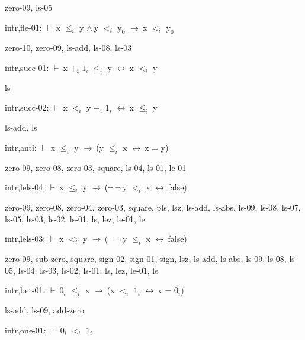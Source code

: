 \documentclass[a4paper]{article}
\newcommand{\Fol}{\mbox{$\vdash\ $}}
\newcommand{\Not}{\mbox{$\neg\ $}}
\newcommand{\And}{\mbox{$\wedge\ $}}
\newcommand{\Imp}{\mbox{$\rightarrow\ $}}
\newcommand{\Equiv}{\mbox{$\leftrightarrow\ $}}
\begin{document}
zero-09, ls-05

\bigskip

intr,fle-01: 
 \Fol x $\mbox{$\le$}_{i}$ y \And y $\mbox{$<$}_{i}$ $\mbox{y}_{0}$ \Imp x $\mbox{$<$}_{i}$ $\mbox{y}_{0}$



zero-10, zero-09, ls-add, ls-08, ls-03

\bigskip

intr,succ-01: 
 \Fol x $\mbox{+}_{i}$ $\mbox{1}_{i}$ $\mbox{$\le$}_{i}$ y \Equiv x $\mbox{$<$}_{i}$ y



ls

\bigskip

intr,succ-02: 
 \Fol x $\mbox{$<$}_{i}$ y $\mbox{+}_{i}$ $\mbox{1}_{i}$ \Equiv x $\mbox{$\le$}_{i}$ y



ls-add, ls

\bigskip

intr,anti: 
 \Fol x $\mbox{$\le$}_{i}$ y \Imp (y $\mbox{$\le$}_{i}$ x \Equiv x = y)



zero-09, zero-08, zero-03, square, ls-04, ls-01, le-01

\bigskip

intr,lels-04: 
 \Fol x $\mbox{$\le$}_{i}$ y \Imp (\Not \Not y $\mbox{$<$}_{i}$ x \Equiv false)



zero-09, zero-08, zero-04, zero-03, square, pls, lsz, ls-add, ls-abs, ls-09, ls-08, ls-07, ls-05, ls-03, ls-02, ls-01, ls, lez, le-01, le

\bigskip

intr,lels-03: 
 \Fol x $\mbox{$<$}_{i}$ y \Imp (\Not \Not y $\mbox{$\le$}_{i}$ x \Equiv false)



zero-09, sub-zero, square, sign-02, sign-01, sign, lsz, ls-add, ls-abs, ls-09, ls-08, ls-05, ls-04, ls-03, ls-02, ls-01, ls, lez, le-01, le

\bigskip

intr,bet-01: 
 \Fol $\mbox{0}_{i}$ $\mbox{$\le$}_{i}$ x \Imp (x $\mbox{$<$}_{i}$ $\mbox{1}_{i}$ \Equiv x = $\mbox{0}_{i}$)



ls-add, ls-09, add-zero

\bigskip

intr,one-01: 
 \Fol $\mbox{0}_{i}$ $\mbox{$<$}_{i}$ $\mbox{1}_{i}$
\end{document}
